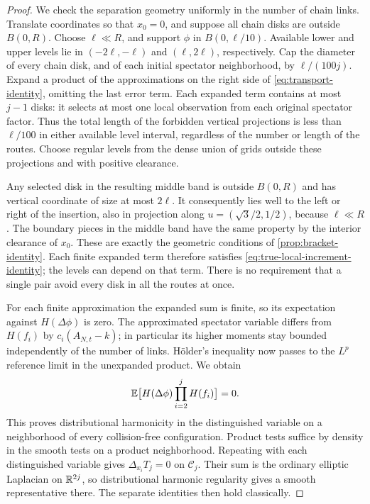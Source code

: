 \begin{proof}
We check the separation geometry uniformly in the number of chain
links. Translate coordinates so that $x_0=0$, and suppose all chain
disks are outside $B(0,R)$. Choose $\ell\ll R$, and support $\phi$
in $B(0,\ell/10)$. Available lower and upper levels lie in
$(-2\ell,-\ell)$ and $(\ell,2\ell)$, respectively. Cap the diameter
of every chain disk, and of each initial spectator neighborhood,
by $\ell/(100j)$. Expand a product of the approximations on the
right side of \eqref{eq:transport-identity}, omitting the last error
term. Each expanded term contains at most $j-1$ disks: it selects
at most one local observation from each original spectator factor.
Thus the total length of the forbidden vertical projections is
less than $\ell/100$ in either available level interval, regardless
of the number or length of the routes. Choose regular levels from
the dense union of grids outside these projections and with positive
clearance.

Any selected disk in the resulting middle band is outside $B(0,R)$
and has vertical coordinate of size at most $2\ell$. It consequently
lies well to the left or right of the insertion, also in projection
along $u=(\sqrt3/2,1/2)$, because $\ell\ll R$. The boundary pieces
in the middle band have the same property by the interior clearance
of $x_0$. These are exactly the geometric conditions of
\cref{prop:bracket-identity}. Each finite expanded term therefore
satisfies \eqref{eq:true-local-increment-identity}; the levels can
depend on that term. There is no requirement that a single pair
avoid every disk in all the routes at once.

For each finite approximation the expanded sum is finite, so its
expectation against $H(\Delta\phi)$ is zero. The approximated
spectator variable differs from $H(f_i)$ by $c_i(A_{N,t}-k)$; in
particular its higher moments stay bounded independently of the
number of links. H\"older's inequality now passes to the $L^p$
reference limit in the unexpanded product. We obtain
\[
             \mathbb E\bigl[H(\Delta\phi)\prod_{i=2}^jH(f_i)\bigr]=0.
\]
This proves distributional harmonicity in the distinguished variable
on a neighborhood of every collision-free configuration. Product
tests suffice by density in the smooth tests on a product
neighborhood. Repeating with each distinguished variable gives
$\Delta_{x_i}T_j=0$ on $\mathcal C_j$. Their sum is the ordinary
elliptic Laplacian on $\mathbb R^{2j}$, so distributional harmonic
regularity gives a smooth representative there. The separate
identities then hold classically.
\end{proof}

